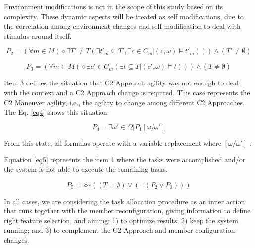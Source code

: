 Environment modifications is not in the scope of this study based on its complexity. These dynamic aspects will be treated as self modifications, due to the correlation among environment changes and self modification to deal with stimulus around itself.



\begin{equation}
\label{eq2}
 P_2 = (\forall m \in M (\diamond \exists T' \ne T (\exists t'_m \subseteq T', \exists c \in C_m | (c, \omega) \models t'_m))) \land (T' \ne \emptyset)  
\end{equation}

\begin{equation}
\label{eq3}
 P_3 = (\forall m \in M (\diamond \exists c' \in C_m ( \exists t \subseteq T | (c',\omega) \models t))) \land (T \ne \emptyset)  
\end{equation}


Item 3 defines the situation that C2 Approach agility was not enough to deal with the context and a C2 Approach change is required. This case represents the C2 Maneuver agility, i.e., the agility to change among different C2 Approaches. The Eq. \eqref{eq4} shows this situation. 

\begin{equation}
\label{eq4}
 P_4 = \exists \omega' \in \Omega | P_1[\omega / \omega']
\end{equation}

From this state, all formulas operate with a variable replacement where $[\omega / \omega']$ .

Equation \eqref{eq5} represents the item 4 where the tasks were accomplished and/or the system is not able to execute the remaining tasks.

\begin{equation}
\label{eq5}
 P_5 = \diamond \square ((T = \emptyset) \lor (\neg (P_2 \lor P_3)))
\end{equation}

In all cases, we are considering the task allocation procedure as an inner action that runs together with the member reconfiguration, giving information to define right feature selection, and aiming: 1) to optimize results; 2) keep the system running; and 3) to complement the C2 Approach and member configuration changes. 


